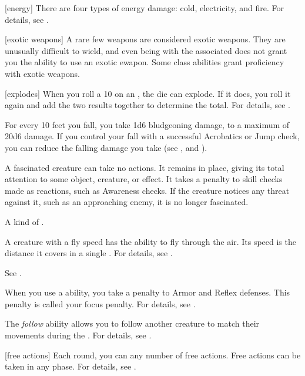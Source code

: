 [energy] There are four types of energy damage: cold, electricity, and fire.
For details, see .

[exotic weapons] A rare few weapons are considered exotic weapons.
They are unusually difficult to wield, and even being  with the associated  does not grant you the ability to use an exotic ewapon.
Some class abilities grant proficiency with exotic weapons.

[explodes] When you roll a 10 on an , the die can explode.
If it does, you roll it again and add the two results together to determine the total.
For details, see .

 For every 10 feet you fall, you take 1d6 bludgeoning damage, to a maximum of 20d6 damage.
If you control your fall with a successful Acrobatics or Jump check, you can reduce the falling damage you take (see , and ).

 A fascinated creature can take no actions. It remains in place, giving its total attention to some object, creature, or effect. It takes a  penalty to skill checks made as reactions, such as Awareness checks.
If the creature notices any threat against it, such as an approaching enemy, it is no longer fascinated.

 A kind of .

 A creature with a fly speed has the ability to fly through the air.
Its speed is the distance it covers in a single .
For details, see .

 See .

 When you use a  ability, you take a  penalty to Armor and Reflex defenses.
This penalty is called your focus penalty.
For details, see .

 The \textit{follow} ability allows you to follow another creature to match their movements during the .
For details, see .

[free actions] Each round, you can any number of free actions.
Free actions can be taken in any phase.
For details, see .

